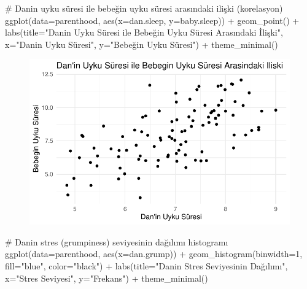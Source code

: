 \documentclass[
  letterpaper,
  DIV=11,
  numbers=noendperiod]{scrartcl}
\newenvironment{Shaded}{\begin{snugshade}}{\end{snugshade}}
\newcommand{\AttributeTok}[1]{\textcolor[rgb]{0.40,0.45,0.13}{#1}}
\newcommand{\CommentTok}[1]{\textcolor[rgb]{0.37,0.37,0.37}{#1}}
\newcommand{\DecValTok}[1]{\textcolor[rgb]{0.68,0.00,0.00}{#1}}
\newcommand{\FunctionTok}[1]{\textcolor[rgb]{0.28,0.35,0.67}{#1}}
\newcommand{\NormalTok}[1]{\textcolor[rgb]{0.00,0.23,0.31}{#1}}
\newcommand{\SpecialCharTok}[1]{\textcolor[rgb]{0.37,0.37,0.37}{#1}}
\newcommand{\StringTok}[1]{\textcolor[rgb]{0.13,0.47,0.30}{#1}}
\begin{document}
\begin{Shaded}
\begin{Highlighting}[]
\CommentTok{\# Dan\textquotesingle{}in uyku süresi ile bebeğin uyku süresi arasındaki ilişki (korelasyon)}
\FunctionTok{ggplot}\NormalTok{(}\AttributeTok{data=}\NormalTok{parenthood, }\FunctionTok{aes}\NormalTok{(}\AttributeTok{x=}\NormalTok{dan.sleep, }\AttributeTok{y=}\NormalTok{baby.sleep)) }\SpecialCharTok{+}
  \FunctionTok{geom\_point}\NormalTok{() }\SpecialCharTok{+}
  \FunctionTok{labs}\NormalTok{(}\AttributeTok{title=}\StringTok{"Dan\textquotesingle{}in Uyku Süresi ile Bebeğin Uyku Süresi Arasındaki İlişki"}\NormalTok{, }\AttributeTok{x=}\StringTok{"Dan\textquotesingle{}in Uyku Süresi"}\NormalTok{, }\AttributeTok{y=}\StringTok{"Bebeğin Uyku Süresi"}\NormalTok{) }\SpecialCharTok{+}
  \FunctionTok{theme\_minimal}\NormalTok{()}
\end{Highlighting}
\end{Shaded}

\begin{figure}[H]

{\centering \includegraphics{4_hafta_tanimlayici_istatistik_files/figure-pdf/unnamed-chunk-22-1.pdf}

}

\end{figure}

\begin{Shaded}
\begin{Highlighting}[]
\CommentTok{\# Dan\textquotesingle{}in stres (grumpiness) seviyesinin dağılımı histogramı}
\FunctionTok{ggplot}\NormalTok{(}\AttributeTok{data=}\NormalTok{parenthood, }\FunctionTok{aes}\NormalTok{(}\AttributeTok{x=}\NormalTok{dan.grump)) }\SpecialCharTok{+}
  \FunctionTok{geom\_histogram}\NormalTok{(}\AttributeTok{binwidth=}\DecValTok{1}\NormalTok{, }\AttributeTok{fill=}\StringTok{"blue"}\NormalTok{, }\AttributeTok{color=}\StringTok{"black"}\NormalTok{) }\SpecialCharTok{+}
  \FunctionTok{labs}\NormalTok{(}\AttributeTok{title=}\StringTok{"Dan\textquotesingle{}in Stres Seviyesinin Dağılımı"}\NormalTok{, }\AttributeTok{x=}\StringTok{"Stres Seviyesi"}\NormalTok{, }\AttributeTok{y=}\StringTok{"Frekans"}\NormalTok{) }\SpecialCharTok{+}
  \FunctionTok{theme\_minimal}\NormalTok{()}
\end{Highlighting}
\end{Shaded}
\end{document}
